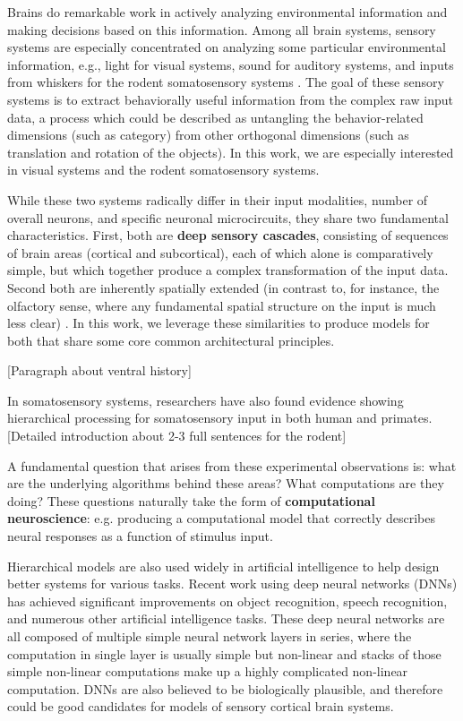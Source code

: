 \documentclass[12pt]{article}
\begin{document}
Brains do remarkable work in actively analyzing environmental information and making decisions based on this information. Among all brain systems, sensory systems are especially concentrated on analyzing some particular environmental information, e.g., light for visual systems, sound for auditory systems, and inputs from whiskers for the rodent somatosensory systems \cite{purves2001neuroscience}.
The goal of these sensory systems is to extract behaviorally useful information from the complex raw input data, a process which could be described as untangling the behavior-related dimensions (such as category) from other orthogonal dimensions (such as translation and rotation of the objects)\cite{yamins2016using}. In this work, we are especially interested in visual systems and the rodent somatosensory systems.

While these two systems radically differ in their input modalities, number of overall neurons, and specific neuronal microcircuits, they share two fundamental characteristics. First, both are \textbf{deep sensory cascades}, consisting of sequences of brain areas (cortical and subcortical), each of which alone is comparatively simple, but which together produce a complex transformation of the input data. Second both are inherently spatially extended (in contrast to, for instance, the olfactory sense, where any fundamental spatial structure on the input is much less clear) \cite{felleman1991distributed}. In this work, we leverage these similarities to produce models for both that share some core common architectural principles.

[Paragraph about ventral history]

In somatosensory systems, researchers have also found evidence showing hierarchical processing for somatosensory input in both human and primates\cite{Pons1987, Inui2004, Iwamura1998}. [Detailed introduction about 2-3 full sentences for the rodent]

A fundamental question that arises from these experimental observations is: what are the underlying algorithms behind these areas? What computations are they doing? These questions naturally take the form of \textbf{computational neuroscience}: e.g. producing a computational model that correctly describes neural responses as a function of stimulus input.

Hierarchical models are also used widely in artificial intelligence to help design better systems for various tasks. Recent work using deep neural networks (DNNs) has achieved significant improvements on object recognition, speech recognition, and numerous other artificial intelligence tasks\cite{Krizhevsky, hinton2012deep, lecun2015deep}. These deep neural networks are all composed of multiple simple neural network layers in series, where the computation in single layer is usually simple but non-linear and stacks of those simple non-linear computations make up a highly complicated non-linear computation. DNNs are also believed to be biologically plausible, and therefore could be good candidates for models of sensory cortical brain systems.
\end{document}
